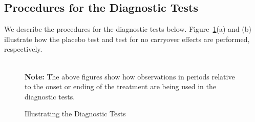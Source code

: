 \documentclass[12pt]{article}
\let\oldcenter\center
\let\oldendcenter\endcenter
\renewenvironment{center}{\setlength\topsep{0pt}\oldcenter}{\oldendcenter}
\begin{document}
\clearpage

\subsection{Procedures for the Diagnostic Tests}

We describe the procedures for the diagnostic tests below. Figure~\ref{fg:tests}(a) and (b) illustrate how the placebo test and test for no carryover effects are performed, respectively.

\begin{figure}[!ht]
\caption{Illustrating the Diagnostic Tests}\label{fg:tests}
\centering
\begin{minipage}{0.95\linewidth}
\begin{center}
\hspace{-2em}
\hspace{2em}
\\
\end{center}
\footnotesize\textbf{Note:} The above figures show how observations in periods relative to the onset or ending of the treatment are being used in the diagnostic tests. 
\end{minipage}
\vspace{-1em}
\end{figure}
\end{document}
